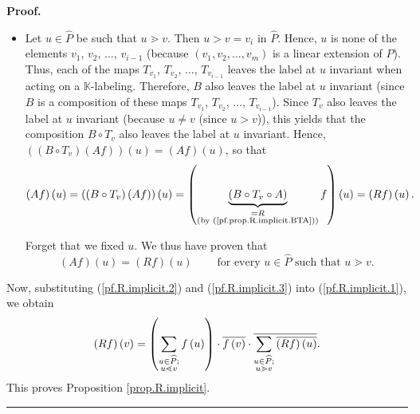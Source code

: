 \documentclass[numbers=enddot,12pt,final,onecolumn,notitlepage]{scrartcl}%
\theoremstyle{definition}
\newenvironment{verlong}{}{}
\newenvironment{proof}[1][Proof]{\noindent\textbf{#1.} }{\ \rule{0.5em}{0.5em}}
\let\sumnonlimits\sum
\renewcommand{\sum}{\sumnonlimits\limits}
\begin{document}
\begin{verlong}
\begin{proof}
\begin{itemize}
Forget that we fixed $u$. We have thus shown that%
\begin{equation}
\left(  Af\right)  \left(  u\right)  =f\left(  u\right)
\ \ \ \ \ \ \ \ \ \ \text{for every }u\in\widehat{P}\text{ such that
}u\lessdot v. \label{pf.R.implicit.2}%
\end{equation}


\item Let $u\in\widehat{P}$ be such that $u\gtrdot v$. Then $u>v=v_{i}$ in
$\widehat{P}$. Hence, $u$ is none of the elements $v_{1}$, $v_{2}$, $\ldots$,
$v_{i-1}$ (because $\left(  v_{1},v_{2},\ldots,v_{m}\right)  $ is a linear
extension of $P$). Thus, each of the maps $T_{v_{1}}$, $T_{v_{2}}$, $\ldots$,
$T_{v_{i-1}}$ leaves the label at $u$ invariant when acting on a $\mathbb{K}%
$-labeling. Therefore, $B$ also leaves the label at $u$ invariant (since $B$
is a composition of these maps $T_{v_{1}}$, $T_{v_{2}}$, $\ldots$,
$T_{v_{i-1}}$). Since $T_{v}$ also leaves the label at $u$ invariant (because
$u\neq v$ (since $u > v$)), this yields that the composition $B\circ T_{v}$
also leaves the label at $u$ invariant. Hence, $\left(  \left(  B\circ
T_{v}\right)  \left(  Af\right)  \right)  \left(  u\right)  =\left(
Af\right)  \left(  u\right)  $, so that%
\[
\left(  Af\right)  \left(  u\right)  =\left(  \left(  B\circ T_{v}\right)
\left(  Af\right)  \right)  \left(  u\right)  =\left(  \underbrace{\left(
B\circ T_{v}\circ A\right)  }_{\substack{=R\\\text{(by
(\ref{pf.prop.R.implicit.BTA}))}}}f\right)  \left(  u\right)  =\left(
Rf\right)  \left(  u\right)  .
\]


Forget that we fixed $u$. We thus have proven that%
\begin{equation}
\left(  Af\right)  \left(  u\right)  =\left(  Rf\right)  \left(  u\right)
\ \ \ \ \ \ \ \ \ \ \text{for every }u\in\widehat{P}\text{ such that }u\gtrdot
v. \label{pf.R.implicit.3}%
\end{equation}

\end{itemize}

Now, substituting (\ref{pf.R.implicit.2}) and (\ref{pf.R.implicit.3}) into
(\ref{pf.R.implicit.1}), we obtain%
\[
\left(  Rf\right)  \left(  v\right)  =\left(  \sum\limits_{\substack{u\in
\widehat{P};\\u\lessdot v}}f\left(  u\right)  \right)  \cdot\overline{f\left(
v\right)  }\cdot\overline{\sum\limits_{\substack{u\in\widehat{P};\\u\gtrdot
v}}\overline{\left(  Rf\right)  \left(  u\right)  }}.
\]
This proves Proposition \ref{prop.R.implicit}.
\end{proof}
\end{verlong}
\end{document}
